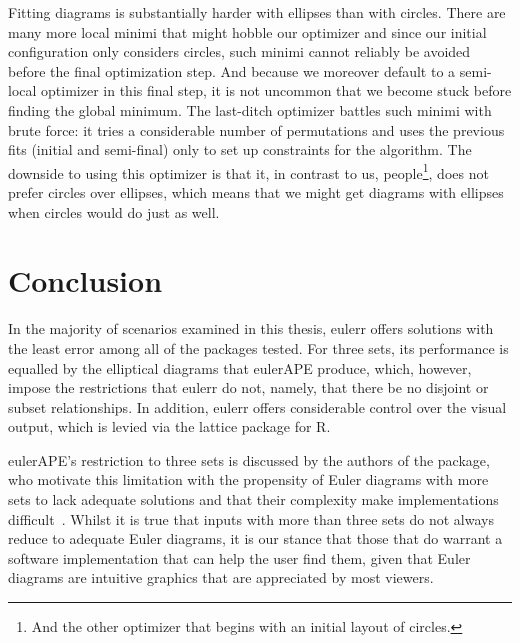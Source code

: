 \documentclass[
  oneside,
  openany,
  numbers=noendperiod,
  parskip=half,
  bibliography=totoc
]{scrbook}\usepackage[]{graphicx}\usepackage{xcolor}
\newcommand{\pkg}[1]{{\fontseries{b}\selectfont #1}}
\begin{document}
Fitting diagrams is substantially harder with ellipses than with circles.
There are many more local minimi that might hobble our optimizer
and since our initial configuration only
considers circles, such minimi cannot reliably be avoided before the final
optimization step. And because we moreover default to a semi-local optimizer in this final step,
it is not uncommon that we become stuck before finding the global minimum.
The last-ditch optimizer
battles such minimi with brute force: it tries a considerable number of permutations
and uses the previous fits (initial and semi-final) only to set up
constraints for the algorithm. The downside to using this optimizer is that it,
in contrast to us, people\footnote{And the other
optimizer that begins with an initial layout of circles.},
does not prefer circles over ellipses, which means that we might get diagrams
with ellipses when circles would do just as well.

\section{Conclusion}
\label{sec:conclusion}

In the majority of scenarios examined in this thesis,
\pkg{eulerr} offers solutions with the least error among all of the packages
tested. For three sets, its performance is equalled by the elliptical diagrams that
\pkg{eulerAPE} produce, which, however, impose the restrictions that
\pkg{eulerr} do not, namely, that there be no disjoint or subset relationships.
In addition, \pkg{eulerr} offers considerable control over the visual output,
which is levied via the \pkg{lattice} package for R.

\pkg{eulerAPE}'s restriction to three sets is discussed by the authors of the
package, who motivate this limitation with the propensity of Euler diagrams with
more sets to lack adequate solutions and that their complexity make
implementations difficult~\citep{Micallef_2013}. Whilst it is true that
inputs with more than three sets do not always reduce to adequate Euler diagrams,
it is our stance that those that do warrant a software implementation that
can help the user find them, given that Euler diagrams are intuitive
graphics that are appreciated by most viewers.
\end{document}
